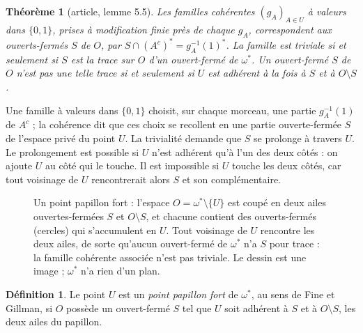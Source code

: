 \documentclass[11pt,a4paper]{amsart}
\theoremstyle{definition}
\newtheorem{definition}{Définition}
\theoremstyle{plain}
\newtheorem{theoreme}{Théorème}
\theoremstyle{remark}
\begin{document}
\begin{theoreme}[article, lemme 5.5]
Les familles cohérentes $(g_A)_{A\in U}$ à valeurs dans $\{0,1\}$, prises à modification finie près de chaque $g_A$, correspondent aux ouverts-fermés $S$ de $O$, par $S\cap(A^c)^*=g_A^{-1}(1)^*$. La famille est triviale si et seulement si $S$ est la trace sur $O$ d'un ouvert-fermé de $\omega^*$. Un ouvert-fermé $S$ de $O$ n'est pas une telle trace si et seulement si $U$ est adhérent à la fois à $S$ et à $O\setminus S$.
\end{theoreme}

Une famille à valeurs dans $\{0,1\}$ choisit, sur chaque morceau, une partie $g_A^{-1}(1)$ de $A^c$ ; la cohérence dit que ces choix se recollent en une partie ouverte-fermée $S$ de l'espace privé du point $U$. La trivialité demande que $S$ se prolonge à travers $U$. Le prolongement est possible si $U$ n'est adhérent qu'à l'un des deux côtés : on ajoute $U$ au côté qui le touche. Il est impossible si $U$ touche les deux côtés, car tout voisinage de $U$ rencontrerait alors $S$ et son complémentaire.

\begin{figure}[htbp]
\centering
{}
\caption{Un point papillon fort : l'espace $O=\omega^*\setminus\{U\}$ est coupé en deux ailes ouvertes-fermées $S$ et $O\setminus S$, et chacune contient des ouverts-fermés (cercles) qui s'accumulent en $U$. Tout voisinage de $U$ rencontre les deux ailes, de sorte qu'aucun ouvert-fermé de $\omega^*$ n'a $S$ pour trace : la famille cohérente associée n'est pas triviale. Le dessin est une image ; $\omega^*$ n'a rien d'un plan.}\label{fig:papillon}
\end{figure}

\begin{definition}
Le point $U$ est un \emph{point papillon fort} de $\omega^*$, au sens de Fine et Gillman, si $O$ possède un ouvert-fermé $S$ tel que $U$ soit adhérent à $S$ et à $O\setminus S$, les deux ailes du papillon.
\end{definition}
\end{document}
